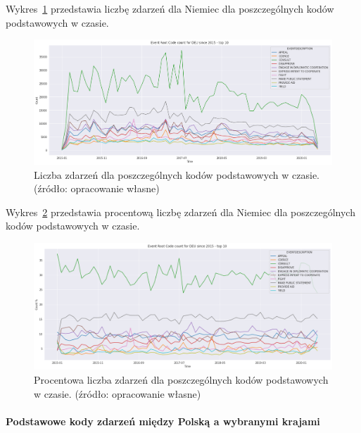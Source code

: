 \documentclass[11pt]{report}
\begin{document}
    Wykres~\ref{fig:DEUPERCinTIME} przedstawia liczbę zdarzeń dla Niemiec dla poszczególnych kodów podstawowych w czasie.
    \begin{figure}[!htp]
        \centering
        \includegraphics[width=1 \textwidth]{fig/DEU/DEUERCinTIME.png}
        \caption{Liczba zdarzeń dla poszczególnych kodów podstawowych w czasie. (źródło: opracowanie własne)}
        \label{fig:DEUPERCinTIME}
    \end{figure}

    Wykres~\ref{fig:DEUPERCpercinTIME} przedstawia procentową liczbę zdarzeń dla Niemiec dla poszczególnych kodów podstawowych w czasie.
    \begin{figure}[!htp]
        \centering
        \includegraphics[width=1 \textwidth]{fig/DEU/DEUERCpercinTIME.png}
        \caption{Procentowa liczba zdarzeń dla poszczególnych kodów podstawowych w czasie. (źródło: opracowanie własne)}
        \label{fig:DEUPERCpercinTIME}
    \end{figure}

    \paragraph{Podstawowe kody zdarzeń między Polską a wybranymi krajami}
\end{document}
